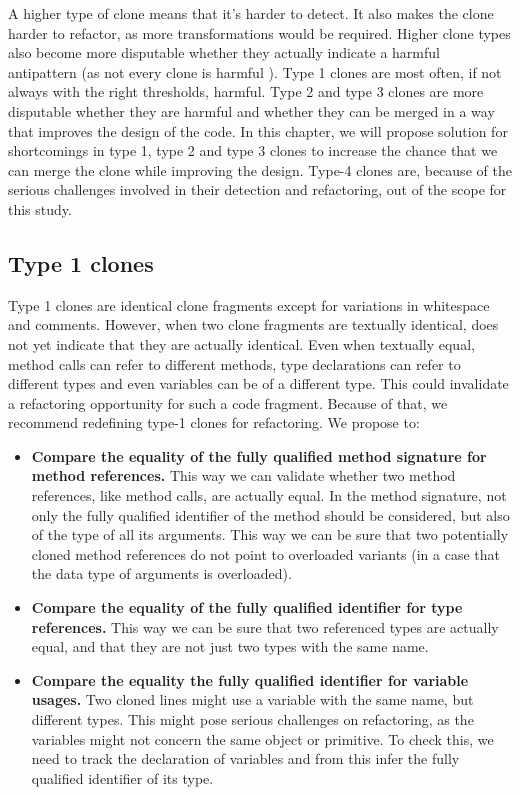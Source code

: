 \documentclass[a4paper]{article}
\begin{document}
A higher type of clone means that it's harder to detect. It also makes the clone harder to refactor, as more transformations would be required. Higher clone types also become more disputable whether they actually indicate a harmful antipattern (as not every clone is harmful \cite{jarzabek2010clones, kapser2008cloning}). Type 1 clones are most often, if not always with the right thresholds, harmful. Type 2 and type 3 clones are more disputable whether they are harmful and whether they can be merged in a way that improves the design of the code. In this chapter, we will propose solution for shortcomings in type 1, type 2 and type 3 clones to increase the chance that we can merge the clone while improving the design. Type-4 clones are, because of the serious challenges involved in their detection and refactoring, out of the scope for this study.

\subsection{Type 1 clones}
Type 1 clones are identical clone fragments except for variations in whitespace and comments. However, when two clone fragments are textually identical, does not yet indicate that they are actually identical. Even when textually equal, method calls can refer to different methods, type declarations can refer to different types and even variables can be of a different type. This could invalidate a refactoring opportunity for such a code fragment. Because of that, we recommend redefining type-1 clones for refactoring. We propose to:
\begin{itemize}
  \item \textbf{Compare the equality of the fully qualified method signature for method references.} This way we can validate whether two method references, like method calls, are actually equal. In the method signature, not only the fully qualified identifier of the method should be considered, but also of the type of all its arguments. This way we can be sure that two potentially cloned method references do not point to overloaded variants (in a case that the data type of arguments is overloaded).
  \item \textbf{Compare the equality of the fully qualified identifier for type references.} This way we can be sure that two referenced types are actually equal, and that they are not just two types with the same name.
  \item \textbf{Compare the equality the fully qualified identifier for variable usages.} Two cloned lines might use a variable with the same name, but different types. This might pose serious challenges on refactoring, as the variables might not concern the same object or primitive. To check this, we need to track the declaration of variables and from this infer the fully qualified identifier of its type.
\end{itemize}
\end{document}
